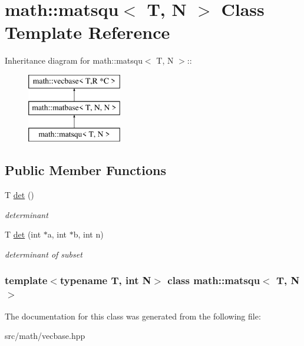 \hypertarget{classmath_1_1matsqu}{
\section{math::matsqu$<$ T, N $>$ Class Template Reference}
\label{classmath_1_1matsqu}
}
Inheritance diagram for math::matsqu$<$ T, N $>$::\begin{figure}[H]
\begin{center}
\leavevmode
\includegraphics[height=3cm]{classmath_1_1matsqu}
\end{center}
\end{figure}
\subsection*{Public Member Functions}
\begin{DoxyCompactItemize}
\item 
\hypertarget{classmath_1_1matsqu_a04647ad3f7539a9aac5654a2e569682a}{
T \hyperlink{classmath_1_1matsqu_a04647ad3f7539a9aac5654a2e569682a}{det} ()}
\label{classmath_1_1matsqu_a04647ad3f7539a9aac5654a2e569682a}

\begin{DoxyCompactList}\small\item\em determinant \item\end{DoxyCompactList}\item 
\hypertarget{classmath_1_1matsqu_a5a63541112ab40372e761931e7843727}{
T \hyperlink{classmath_1_1matsqu_a5a63541112ab40372e761931e7843727}{det} (int $\ast$a, int $\ast$b, int n)}
\label{classmath_1_1matsqu_a5a63541112ab40372e761931e7843727}

\begin{DoxyCompactList}\small\item\em determinant of subset \item\end{DoxyCompactList}\end{DoxyCompactItemize}
\subsubsection*{template$<$typename T, int N$>$ class math::matsqu$<$ T, N $>$}



The documentation for this class was generated from the following file:\begin{DoxyCompactItemize}
\item 
src/math/vecbase.hpp\end{DoxyCompactItemize}
